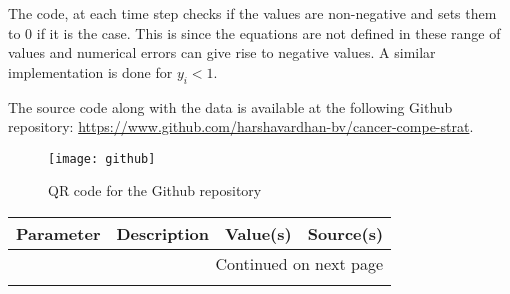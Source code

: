 The code, at each time step checks if the values are non-negative and sets them to 0 if it is the case. This is since the equations are not defined in these range of values and numerical errors can give rise to negative values. A similar implementation is done for $y_i < 1$.

The source code along with the data is available at the following Github repository: \url{https://www.github.com/harshavardhan-bv/cancer-compe-strat}.
\begin{figure}[h]
  \centering
  \texttt{[image: github]}
  \caption{QR code for the Github repository}
  \label{github}
\end{figure}


\newpage
\begin{longtable}[c]{|l|p{4.3cm}|c|p{2.3cm}|}

  \hline \multicolumn{1}{|c|}{\textbf{Parameter}} & \multicolumn{1}{c|}{\textbf{Description}} & \multicolumn{1}{c|}{\textbf{Value(s)}} & \multicolumn{1}{c|}{\textbf{Source(s)}}\\ \hline
  \endhead

  \hline \multicolumn{4}{|r|}{{Continued on next page}} \\ \hline
  \endfoot

  \endlastfoot


\end{longtable}
